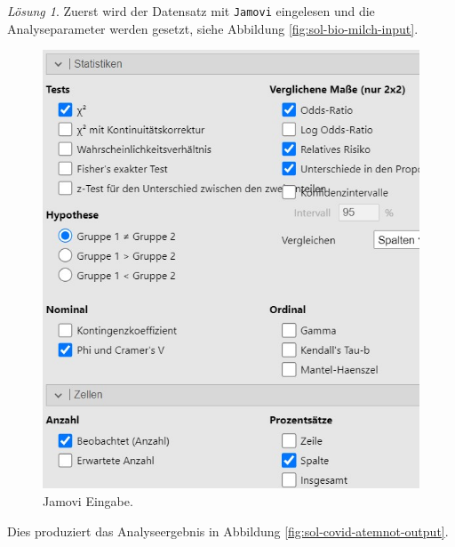 \documentclass[
]{book}
\theoremstyle{definition}
\theoremstyle{definition}
\theoremstyle{definition}
\theoremstyle{definition}
\theoremstyle{remark}
\newtheorem*{solution}{Lösung}
\begin{document}
\begin{solution}

Zuerst wird der Datensatz mit \texttt{Jamovi} eingelesen und die
Analyseparameter werden gesetzt, siehe Abbildung
\ref{fig:sol-bio-milch-input}.

\begin{figure}

{\centering \includegraphics{figures/09-exr-covid-atemnot-jmv-input} 

}

\caption{Jamovi Eingabe.}\label{fig:sol-covid-atemnot-input}
\end{figure}

Dies produziert das Analyseergebnis in Abbildung
\ref{fig:sol-covid-atemnot-output}.

\begin{figure}


\end{figure}
\end{solution}
\end{document}
